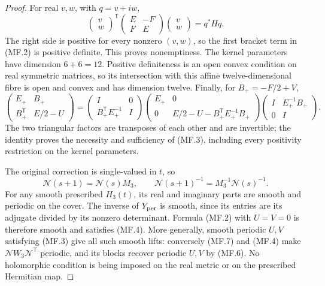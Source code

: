 \begin{proof}
For real $v,w$, with $q=v+iw$,
\[
 \begin{pmatrix}v\\w\end{pmatrix}^{\mathsf T}
 \begin{pmatrix}E&-F\\F&E\end{pmatrix}
 \begin{pmatrix}v\\w\end{pmatrix}=q^*Hq.
\]
The right side is positive for every nonzero $(v,w)$, so the first
bracket term in (MF.2) is positive definite.  This proves nonemptiness.
The kernel parameters have dimension $6+6=12$.  Positive definiteness
is an open convex condition on real symmetric matrices, so its intersection
with this affine twelve-dimensional fibre is open and convex and has
dimension twelve.  Finally, for $B_+=-F/2+V$,
\[
 \begin{pmatrix}E_+&B_+\\B_+^{\mathsf T}&E/2-U\end{pmatrix}
 =
 \begin{pmatrix}I&0\\B_+^{\mathsf T}E_+^{-1}&I\end{pmatrix}
 \begin{pmatrix}E_+&0\\0&E/2-U-B_+^{\mathsf T}E_+^{-1}B_+\end{pmatrix}
 \begin{pmatrix}I&E_+^{-1}B_+\\0&I\end{pmatrix}.
\]
The two triangular factors are transposes of each other and are invertible;
the identity proves the necessity and sufficiency of
(MF.3), including every positivity restriction on the kernel parameters.

The original correction is single-valued in $t$, so
\[
 \mathcal N(s+1)=\mathcal N(s)M_3,\qquad
 \mathcal N(s+1)^{-1}=M_3^{-1}\mathcal N(s)^{-1}.               \tag{MF.7}
\]
For any smooth prescribed $H_3(t)$, its real and imaginary parts are smooth
and periodic on the cover.  The inverse of $Y_{\rm per}$ is smooth,
since its entries are its adjugate divided by its nonzero determinant.
Formula (MF.2) with $U=V=0$ is therefore smooth and satisfies (MF.4).
More generally, smooth periodic $U,V$ satisfying (MF.3) give all such
smooth lifts: conversely (MF.7) and (MF.4) make
$\mathcal NW_3\mathcal N^{\mathsf T}$ periodic, and its blocks recover
periodic $U,V$ by (MF.6).  No holomorphic condition is being imposed on
the real metric or on the prescribed Hermitian map.


\end{proof}
